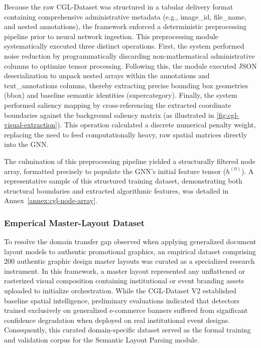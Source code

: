 \begin{refsection}
Because the raw CGL-Dataset was structured in a tabular delivery format containing comprehensive administrative metadata (e.g., image\_id, file\_name, and nested annotations), the framework enforced a deterministic preprocessing pipeline prior to neural network ingestion. This preprocessing module systematically executed three distinct operations. First, the system performed noise reduction by programmatically discarding non-mathematical administrative columns to optimize tensor processing. Following this, the module executed JSON deserialization to unpack nested arrays within the annotations and text\_annotations columns, thereby extracting precise bounding box geometries (bbox) and baseline semantic identities (supercategory). Finally, the system performed saliency mapping by cross-referencing the extracted coordinate boundaries against the background saliency matrix (as illustrated in \ref{fig:cgl-visual-extraction}). This operation calculated a discrete numerical penalty weight, replacing the need to feed computationally heavy, raw spatial matrices directly into the GNN.

The culmination of this preprocessing pipeline yielded a structurally filtered node array, formatted precisely to populate the GNN's initial feature tensor ($h^{(0)}$). A representative sample of this structured training dataset, demonstrating both structural boundaries and extracted algorithmic features, was detailed in Annex~\ref{annex:cgl-node-array}.

\subsubsection{Emperical Master-Layout Dataset}
To resolve the domain transfer gap observed when applying generalized document layout models to authentic promotional graphics, an empirical dataset comprising 200 authentic graphic design master layouts was curated as a specialized research instrument. In this framework, a master layout represented any unflattened or rasterized visual composition containing institutional or event branding assets uploaded to initialize orchestration. While the CGL-Dataset V2 established baseline spatial intelligence, preliminary evaluations indicated that detectors trained exclusively on generalized e-commerce banners suffered from significant confidence degradation when deployed on real institutional event designs. Consequently, this curated domain-specific dataset served as the formal training and validation corpus for the Semantic Layout Parsing module.


\end{refsection}
